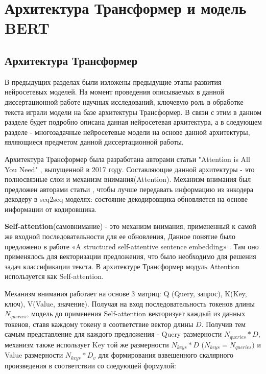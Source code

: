 \chapter{Архитектура Трансформер и модель BERT}\label{trbert}

\section{Архитектура Трансформер}

В предыдущих разделах были изложены предыдущие этапы развития нейросетевых моделей. На момент проведения описываемых в данной диссертационной работе научных исследований, ключевую роль в обработке текста играли модели на базе архитектуры Трансформер. В связи с этим в данном разделе будет подробно описана данная нейросетевая архитектура, а в следующем разделе - многозадачные нейросетевые модели на основе данной архитектуры, являющиеся предметом данной диссертационной работы. 

Архитектура Трансформер была разработана авторами статьи "Attention is All You Need" \cite{Vaswani_Shazeer_Parmar_Uszkoreit_Jones_Gomez_Kaiser_Polosukhin_2017}, выпущенной в 2017 году. Составляющие данной архитектуры - это полносвязные слои и механизм внимания(Attention). Механизм внимания был предложен авторами статьи , чтобы лучше передавать информацию из энкодера декодеру в seq2seq моделях: состояние декодировщика обновляется на основе информации от кодировщика.  

\textbf{Self-attention}(самовнимание) - это механизм внимания, примененный к самой же входной последовательности для ее обновления, Данное понятие было предложено в работе «A structured self-attentive sentence embedding» \cite{Lin_Feng_Ccero Nogueira dos Santos_Yu_Xiang_Zhou_Bengio_2017}. Там оно применялось для векторизации предложения, что было необходимо для решения задач классификации текста. В архитектуре Трансформер модуль Attention используется как Self-attention.  

Механизм внимания работает на основе 3 матриц:  Q (Query, запрос), K(Key, ключ), V(Value, значение). 
Получая на вход последовательность токенов длины $N_{queries}$, модель до применения Self-attention векторизует каждый из данных токенов, ставя каждому токену в соответствие вектор длины $D$. Получив тем самым представление для каждого предложения - Query размерности $N_{queries}*D$, механизм также использует Key той же размерности $N_{keys}*D$ ($N_{keys}= N_{queries})$ и Value размерности $N_{keys}*D_{v}$ для формирования взвешенного скалярного произведения в соответствии со следующей формулой:

